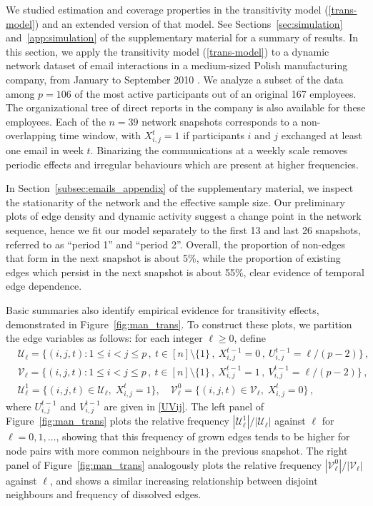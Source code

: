 \documentclass[12pt]{article}
\newcommand{\0}{{\bf 0}}
\begin{document}
We studied estimation and coverage properties in the transitivity model (\ref{trans-model}) and an extended version of that model.  See Sections~\ref{sec:simulation} and~\ref{app:simulation} of the supplementary material for a summary of results. In this section, we apply the transitivity model (\ref{trans-model}) to a dynamic network dataset of email interactions in a medium-sized Polish manufacturing company, from January to September 2010 \citep{michalski2011}.
We analyze a subset of the data among $p=106$ of the most active participants out of an original 167 employees.
The organizational tree of direct reports in the company is also available for these employees. 
Each of the $n=39$ network snapshots corresponds to a non-overlapping time window, with $X_{i,j}^t=1$ if participants $i$ and $j$ exchanged at least one email in week $t$. Binarizing the communications at a weekly scale removes periodic effects and irregular behaviours which are present at higher frequencies.

In Section~\ref{subsec:emails_appendix} of the supplementary material, we inspect the stationarity of the network and the effective sample size. 
Our preliminary plots of edge density and dynamic activity suggest a change point in the network sequence, hence we fit our model separately to the first 13 and last 26 snapshots, referred to as ``period 1'' and ``period 2''.  
Overall, the proportion of non-edges that form in the next snapshot is about 5\%, while the proportion of existing edges which persist in the next snapshot is about 55\%, clear evidence of temporal edge dependence.


Basic summaries also identify empirical evidence for transitivity effects, demonstrated in Figure~\ref{fig:man_trans}.
To construct these plots, we partition the edge variables as follows: for each integer $\ell\geq0$, define
\begin{align*}
    &\mathcal{U}_\ell = \big\{(i,j,t) : 1 \leq i < j \leq p\,, ~t \in [n]\setminus\{1\}\,, ~X_{i,j}^{t-1}=0\,, ~U_{i,j}^{t-1} = \ell/(p-2) \big\}\,, \\
    &\mathcal{V}_\ell = \big\{(i,j,t) : 1 \leq i < j \leq p\,, ~t \in[n]\setminus\{1\}\,, ~X_{i,j}^{t-1}=1\,, ~V_{i,j}^{t-1} = \ell/(p-2) \big\}\,,\\
    &\mathcal{U}_\ell^1 = \big\{(i,j,t) \in \mathcal{U}_\ell, \; X_{i,j}^t=1 \big\}, \quad 
    \mathcal{V}_\ell^0 = \big\{(i,j,t) \in \mathcal{V}_\ell,\; X_{i,j}^t=0
    \big\}\,,
\end{align*}
where $U_{i,j}^{t-1}$ and $V_{i,j}^{t-1}$ are given in \eqref{UVij}. 
The left panel of Figure~\ref{fig:man_trans} plots the relative frequency $|\mathcal{U}_\ell^1|/|\mathcal{U}_\ell|$ against $\ell$ for $\ell =0,1, \ldots$, showing that this frequency of grown edges tends to be higher for node pairs with more common neighbours in the previous snapshot. 
The right panel of Figure~\ref{fig:man_trans} analogously plots the relative frequency  $|\mathcal{V}_\ell^0|/|\mathcal{V}_\ell|$ against $\ell$, and shows a similar increasing relationship between disjoint neighbours and frequency of dissolved edges.
\end{document}
